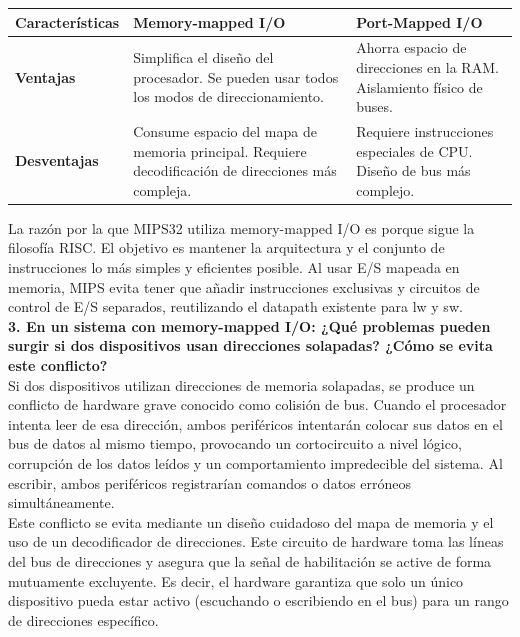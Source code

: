 \documentclass[]{article}
\begin{document}
	\begin{table}[H]
		\centering
		\renewcommand{\arraystretch}{1.5}
		\begin{tabularx}{\textwidth}{|l | X | X |}
			\hline
			\textbf{Características} & \textbf{Memory-mapped I/O} & \textbf{Port-Mapped I/O} \\
			\hline
			\textbf{Ventajas} & Simplifica el diseño del procesador. Se pueden usar todos los modos de direccionamiento. & Ahorra espacio de direcciones en la RAM. Aislamiento físico de buses. \\
			\hline
			\textbf{Desventajas} & Consume espacio del mapa de memoria principal. Requiere decodificación de direcciones más compleja. & Requiere instrucciones especiales de CPU. Diseño de bus más complejo. \\
			\hline
		\end{tabularx}
	\end{table}
	
	La razón por la que MIPS32 utiliza memory-mapped I/O es porque sigue la filosofía RISC. El objetivo es mantener la arquitectura y el conjunto de instrucciones lo más simples y eficientes posible. Al usar E/S mapeada en memoria, MIPS evita tener que añadir instrucciones exclusivas y circuitos de control de E/S separados, reutilizando el datapath existente para lw y sw. \\
	
	{\large \textbf{3. En un sistema con memory-mapped I/O: ¿Qué problemas pueden surgir si dos dispositivos usan direcciones solapadas? ¿Cómo se evita este conflicto?}} \\
	
	Si dos dispositivos utilizan direcciones de memoria solapadas, se produce un conflicto de hardware grave conocido como colisión de bus. Cuando el procesador intenta leer de esa dirección, ambos periféricos intentarán colocar sus datos en el bus de datos al mismo tiempo, provocando un cortocircuito a nivel lógico, corrupción de los datos leídos y un comportamiento impredecible del sistema. Al escribir, ambos periféricos registrarían comandos o datos erróneos simultáneamente. \\
	
	Este conflicto se evita mediante un diseño cuidadoso del mapa de memoria y el uso de un decodificador de direcciones. Este circuito de hardware toma las líneas del bus de direcciones y asegura que la señal de habilitación se active de forma mutuamente excluyente. Es decir, el hardware garantiza que solo un único dispositivo pueda estar activo (escuchando o escribiendo en el bus) para un rango de direcciones específico. \\
	
\end{document}
